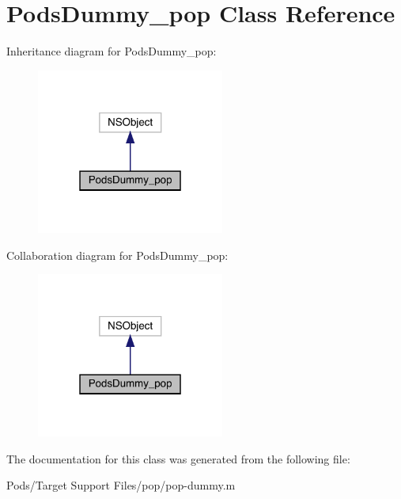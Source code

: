 \hypertarget{interface_pods_dummy__pop}{}\section{Pods\+Dummy\+\_\+pop Class Reference}
\label{interface_pods_dummy__pop}


Inheritance diagram for Pods\+Dummy\+\_\+pop\+:\nopagebreak
\begin{figure}[H]
\begin{center}
\leavevmode
\includegraphics[width=175pt]{interface_pods_dummy__pop__inherit__graph}
\end{center}
\end{figure}


Collaboration diagram for Pods\+Dummy\+\_\+pop\+:\nopagebreak
\begin{figure}[H]
\begin{center}
\leavevmode
\includegraphics[width=175pt]{interface_pods_dummy__pop__coll__graph}
\end{center}
\end{figure}


The documentation for this class was generated from the following file\+:\begin{DoxyCompactItemize}
\item 
Pods/\+Target Support Files/pop/pop-\/dummy.\+m\end{DoxyCompactItemize}
